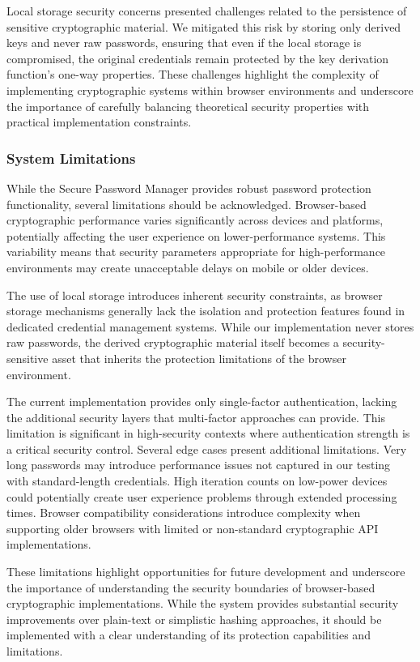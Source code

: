 \documentclass[11pt,a4paper]{article}
\begin{document}
Local storage security concerns presented challenges related to the persistence of sensitive cryptographic material. We mitigated this risk by storing only derived keys and never raw passwords, ensuring that even if the local storage is compromised, the original credentials remain protected by the key derivation function's one-way properties.
These challenges highlight the complexity of implementing cryptographic systems within browser environments and underscore the importance of carefully balancing theoretical security properties with practical implementation constraints.

\subsubsection{System Limitations}
While the Secure Password Manager provides robust password protection functionality, several limitations should be acknowledged. Browser-based cryptographic performance varies significantly across devices and platforms, potentially affecting the user experience on lower-performance systems. This variability means that security parameters appropriate for high-performance environments may create unacceptable delays on mobile or older devices.

The use of local storage introduces inherent security constraints, as browser storage mechanisms generally lack the isolation and protection features found in dedicated credential management systems. While our implementation never stores raw passwords, the derived cryptographic material itself becomes a security-sensitive asset that inherits the protection limitations of the browser environment.

The current implementation provides only single-factor authentication, lacking the additional security layers that multi-factor approaches can provide. This limitation is significant in high-security contexts where authentication strength is a critical security control.
Several edge cases present additional limitations. Very long passwords may introduce performance issues not captured in our testing with standard-length credentials. High iteration counts on low-power devices could potentially create user experience problems through extended processing times. Browser compatibility considerations introduce complexity when supporting older browsers with limited or non-standard cryptographic API implementations.

These limitations highlight opportunities for future development and underscore the importance of understanding the security boundaries of browser-based cryptographic implementations. While the system provides substantial security improvements over plain-text or simplistic hashing approaches, it should be implemented with a clear understanding of its protection capabilities and limitations.
\end{document}
